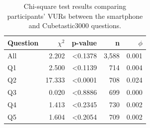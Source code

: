 \documentclass{acm_proc_article-sp}
\begin{document}
\begin{table}%
\begin{center}
\begin{tabular}{|l|r|r|r|r|}
\hline
Question & $\chi^2$ & p-value & n & $\phi$ \\
\hline
All & 2.202 & <0.1378 & 3,588 & 0.001\\
Q1 & 2.500 & <0.1139 & 714 & 0.004\\
Q2 & 17.333 & <0.0001 & 708 &  0.024\\
Q3 & 0.020 & <0.8886 & 699 &  0.000\\
Q4 & 1.413 & <0.2345 & 730& 0.002\\
Q5 & 1.604 & <0.2054 & 709 & 0.002\\
\hline
\end{tabular}
\caption{Chi-square test results comparing participants' VURs between the smartphone and Cubetastic3000 questions.}
\label{betweendevice}
\end{center}
\end{table}
						
\end{document}
